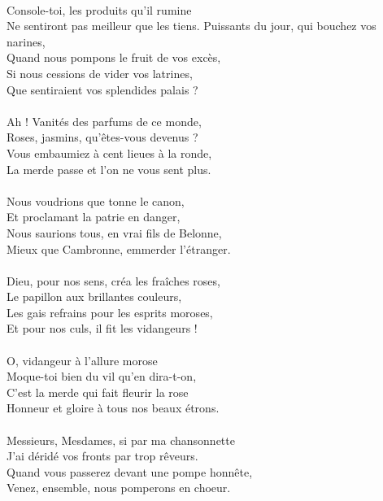 \\Console-toi, les produits qu'il rumine
\\Ne sentiront pas meilleur que les tiens.
\breakpage
Puissants du jour, qui bouchez vos narines,
\\Quand nous pompons le fruit de vos excès,
\\Si nous cessions de vider vos latrines,
\\Que sentiraient vos splendides palais ?
\\\\Ah ! Vanités des parfums de ce monde,
\\Roses, jasmins, qu'êtes-vous devenus ?
\\Vous embaumiez à cent lieues à la ronde,
\\La merde passe et l'on ne vous sent plus.
\\\\Nous voudrions que tonne le canon,
\\Et proclamant la patrie en danger,
\\Nous saurions tous, en vrai fils de Belonne,
\\Mieux que Cambronne, emmerder l'étranger.
\\\\Dieu, pour nos sens, créa les fraîches roses,
\\Le papillon aux brillantes couleurs,
\\Les gais refrains pour les esprits moroses,
\\Et pour nos culs, il fit les vidangeurs !
\\\\O, vidangeur à l'allure morose
\\Moque-toi bien du vil qu'en dira-t-on,
\\C'est la merde qui fait fleurir la rose
\\Honneur et gloire à tous nos beaux étrons.
\\\\Messieurs, Mesdames, si par ma chansonnette
\\J'ai déridé vos fronts par trop rêveurs.
\\Quand vous passerez devant une pompe honnête,
\\Venez, ensemble, nous pomperons en choeur.

\breakpage
